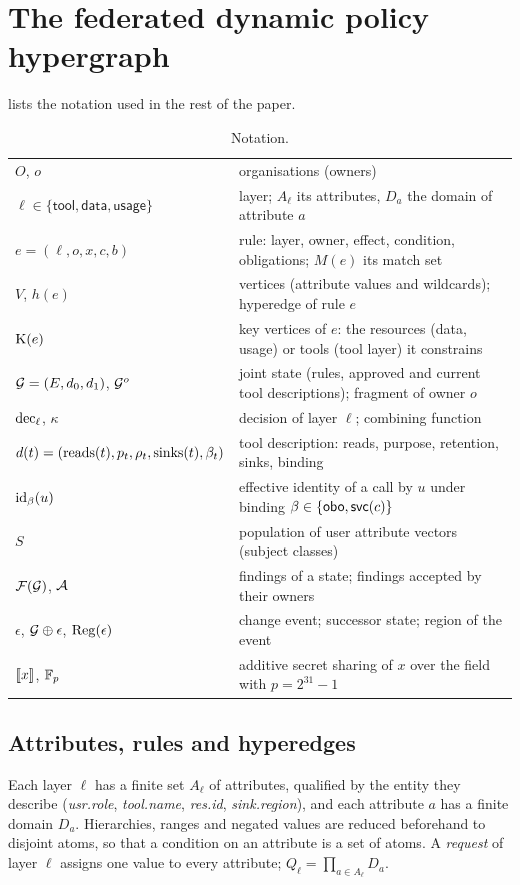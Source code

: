\section{The federated dynamic policy hypergraph}\label{sec:model}

 lists the notation used in the rest of the paper.

\begin{table}[t]
\centering\small
\caption{Notation.}\label{tab:notation}
\begin{tabularx}{\linewidth}{lX}
\toprule
$O$, $o$ & organisations (owners)\\
$\ell \in \{\mathsf{tool},\mathsf{data},\mathsf{usage}\}$ & layer; $A_\ell$ its attributes, $D_a$ the domain of attribute $a$\\
$e = (\ell, o, x, c, b)$ & rule: layer, owner, effect, condition, obligations; $M(e)$ its match set\\
$V$, $h(e)$ & vertices (attribute values and wildcards); hyperedge of rule $e$\\
$\mathrm{K}(e)$ & key vertices of $e$: the resources (data, usage) or tools (tool layer) it constrains\\
$\mathcal{G} = (E, d_0, d_1)$, $\mathcal{G}^o$ & joint state (rules, approved and current tool descriptions); fragment of owner $o$\\
$\mathrm{dec}_\ell$, $\kappa$ & decision of layer $\ell$; combining function\\
$d(t) = (\mathrm{reads}(t), p_t, \rho_t, \mathrm{sinks}(t), \beta_t)$ & tool description: reads, purpose, retention, sinks, binding\\
$\mathrm{id}_\beta(u)$ & effective identity of a call by $u$ under binding $\beta \in \{\mathsf{obo}, \mathsf{svc}(c)\}$\\
$S$ & population of user attribute vectors (subject classes)\\
$\mathcal{F}(\mathcal{G})$, $\mathcal{A}$ & findings of a state; findings accepted by their owners\\
$\epsilon$, $\mathcal{G} \oplus \epsilon$, $\mathrm{Reg}(\epsilon)$ & change event; successor state; region of the event\\
$[\![x]\!]$, $\mathbb{F}_p$ & additive secret sharing of $x$ over the field with $p = 2^{31}-1$\\
\bottomrule
\end{tabularx}
\end{table}

\subsection{Attributes, rules and hyperedges}
Each layer $\ell$ has a finite set $A_\ell$ of attributes, qualified by the entity they describe (\textit{usr.role}, \textit{tool.name}, \textit{res.id}, \textit{sink.region}), and each attribute $a$ has a finite domain $D_a$. Hierarchies, ranges and negated values are reduced beforehand to disjoint atoms, so that a condition on an attribute is a set of atoms. A \emph{request} of layer $\ell$ assigns one value to every attribute; $Q_\ell = \prod_{a \in A_\ell} D_a$.

